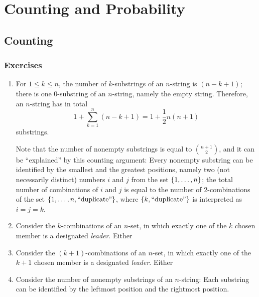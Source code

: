 \setcounter{chapter}{2}
\chapter{Counting and Probability}
\section{Counting}
\subsection*{Exercises}
\begin{enumerate}[\thesection-1]
%
\item For $1 \leq k \leq n$, the number of $k$-substrings of an $n$-string is $(n - k + 1)$; there is one $0$-substring of an $n$-string, namely the empty string. Therefore, an $n$-string has in total
\[
1 + \sum^n_{k = 1} (n - k + 1) = 1 + \frac{1}{2}n(n + 1)
\]
substrings.

Note that the number of nonempty substrings is equal to ${n + 1 \choose 2}$, and it can be ``explained'' by this counting argument: Every nonempty substring can be identified by the smallest and the greatest positions, namely two (not necessarily distinct) numbers $i$ and $j$ from the set $\left\{1, \ldots, n\right\}$; the total number of combinations of $i$ and $j$ is equal to the number of $2$-combinations of the set $\left\{1, \ldots, n, \mbox{``duplicate''}\right\}$, where $\left\{k, \mbox{``duplicate''}\right\}$ is interpreted as $i = j = k$.
%
\setcounter{enumi}{4}
%
\item Consider the $k$-combinations of an $n$-set, in which exactly one of the $k$ chosen member is a designated \emph{leader}. Either
%
\item Consider the $(k + 1)$-combinations of an $n$-set, in which exactly one of the $k + 1$ chosen member is a designated \emph{leader}. Either
%
\setcounter{enumi}{8}
%
\item Consider the number of nonempty substrings of an $n$-string: Each substring can be identified by the leftmost position and the rightmost position.
%
\end{enumerate}
